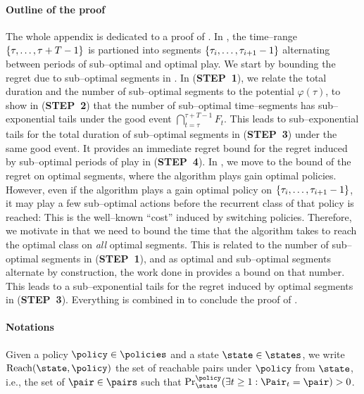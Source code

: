 \documentclass[preprint,cleveref,12pt]{colt2025}
\DeclarePairedDelimiter{\braces}{\{}{\}}	%
\DeclarePairedDelimiter{\parens}{(}{)}	%
\def\Reach{\mathrm{Reach}}
\def\STEP#1{(\strong{STEP~#1})}
\newcommand{\strong}[1]{\textbf{#1}}
\begin{document}
    \paragraph{Outline of the proof}
    The whole appendix is dedicated to a proof of .
    In , the time--range $\braces{\tau, \ldots, \tau + T - 1}$ is partioned into segments $\braces{\tau_i, \ldots, \tau_{i+1}-1}$ alternating between periods of sub--optimal and optimal play. 
    We start by bounding the regret due to sub--optimal segments in .
    In \STEP{1}, we relate the total duration and the number of sub--optimal segments to the potential $\varphi(\tau)$, to show in \STEP{2} that the number of sub--optimal time--segments has sub--exponential tails under the good event $\bigcap_{t=\tau}^{\tau+T-1} F_t$.
    This leads to sub--exponential tails for the total duration of sub--optimal segments in \STEP{3} under the same good event.
    It provides an immediate regret bound for the regret induced by sub--optimal periods of play in \STEP{4}.
    In , we move to the bound of the regret on optimal segments, where the algorithm plays gain optimal policies. 
    However, even if the algorithm plays a gain optimal policy on $\braces{\tau_i, \ldots, \tau_{i+1}-1}$, it may play a few sub--optimal actions before the recurrent class of that policy is reached: This is the well--known ``cost'' induced by switching policies. 
    Therefore, we motivate in  that we need to bound the time that the algorithm takes to reach the optimal class on \emph{all} optimal segments.
    This is related to the number of sub--optimal segments in \STEP{1}, and as optimal and sub--optimal segments alternate by construction, the work done in  provides a bound on that number.
    This leads to a sub--exponential tails for the regret induced by optimal segments in \STEP{3}.
    Everything is combined in  to conclude the proof of .

    \paragraph{Notations}
    Given a policy $\policy \in \policies$ and a state $\state \in \states$, we write $\Reach(\state, \policy)$ the set of reachable pairs under $\policy$ from $\state$, i.e., the set of $\pair \in \pairs$ such that $\Pr_{\state}^{\policy}\parens*{\exists t \ge 1: \Pair_t = \pair} > 0$.
\end{document}
